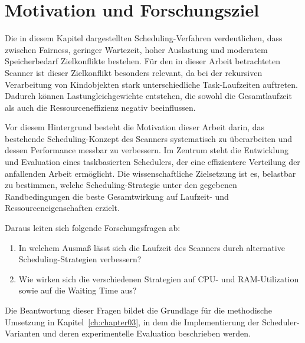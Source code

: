 \begin{sloppypar}
\section{Motivation und Forschungsziel}

\noindent Die in diesem Kapitel dargestellten Scheduling-Verfahren verdeutlichen, dass zwischen Fairness, geringer Wartezeit, hoher Auslastung und moderatem Speicherbedarf Zielkonflikte bestehen.
Für den in dieser Arbeit betrachteten Scanner ist dieser Zielkonflikt besonders relevant, da bei der rekursiven Verarbeitung von Kindobjekten stark unterschiedliche Task-Laufzeiten auftreten.
Dadurch können Lastungleichgewichte entstehen, die sowohl die Gesamtlaufzeit als auch die Ressourceneffizienz negativ beeinflussen.

\vspace{7.56mm}

\noindent Vor diesem Hintergrund besteht die Motivation dieser Arbeit darin, das bestehende Scheduling-Konzept des Scanners systematisch zu überarbeiten und dessen Performance messbar zu verbessern.
Im Zentrum steht die Entwicklung und Evaluation eines taskbasierten Schedulers, der eine effizientere Verteilung der anfallenden Arbeit ermöglicht.
Die wissenschaftliche Zielsetzung ist es, belastbar zu bestimmen, welche Scheduling-Strategie unter den gegebenen Randbedingungen die beste Gesamtwirkung auf Laufzeit- und Ressourceneigenschaften erzielt.

\vspace{7.56mm}

\noindent Daraus leiten sich folgende Forschungsfragen ab:
\begin{enumerate}
    \item In welchem Ausmaß lässt sich die Laufzeit des Scanners durch alternative Scheduling-Strategien verbessern?
    \item Wie wirken sich die verschiedenen Strategien auf \acs{CPU}- und \acs{RAM}-Utilization sowie auf die Waiting Time aus?
\end{enumerate}

\vspace{7.56mm}

\noindent Die Beantwortung dieser Fragen bildet die Grundlage für die methodische Umsetzung in Kapitel~\ref{ch:chapter03}, in dem die Implementierung der Scheduler-Varianten und deren experimentelle Evaluation beschrieben werden.

\end{sloppypar}
